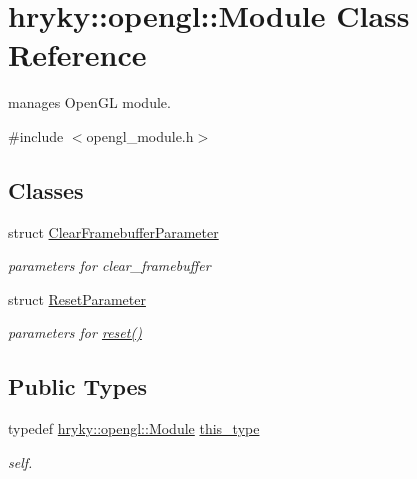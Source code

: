 \hypertarget{classhryky_1_1opengl_1_1_module}{\section{hryky\-:\-:opengl\-:\-:Module Class Reference}
\label{classhryky_1_1opengl_1_1_module}
}


manages Open\-G\-L module.  




{\ttfamily \#include $<$opengl\-\_\-module.\-h$>$}

\subsection*{Classes}
\begin{DoxyCompactItemize}
\item 
struct \hyperlink{structhryky_1_1opengl_1_1_module_1_1_clear_framebuffer_parameter}{Clear\-Framebuffer\-Parameter}
\begin{DoxyCompactList}\small\item\em parameters for clear\-\_\-framebuffer \end{DoxyCompactList}\item 
struct \hyperlink{structhryky_1_1opengl_1_1_module_1_1_reset_parameter}{Reset\-Parameter}
\begin{DoxyCompactList}\small\item\em parameters for \hyperlink{classhryky_1_1opengl_1_1_module_af09eb5e4e4a6e8f89efdc7b97a220556}{reset()} \end{DoxyCompactList}\end{DoxyCompactItemize}
\subsection*{Public Types}
\begin{DoxyCompactItemize}
\item 
\hypertarget{classhryky_1_1opengl_1_1_module_a686352fcdf02c0a7ec5c6bc7d3eb1bb6}{typedef \hyperlink{classhryky_1_1opengl_1_1_module}{hryky\-::opengl\-::\-Module} \hyperlink{classhryky_1_1opengl_1_1_module_a686352fcdf02c0a7ec5c6bc7d3eb1bb6}{this\-\_\-type}}\label{classhryky_1_1opengl_1_1_module_a686352fcdf02c0a7ec5c6bc7d3eb1bb6}

\begin{DoxyCompactList}\small\item\em self. \end{DoxyCompactList}\end{DoxyCompactItemize}

